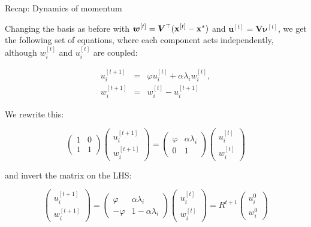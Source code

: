 \documentclass[11pt,compress,t,notes=noshow, xcolor=table]{beamer}
\begin{document}
\begin{vbframe}{Recap: Dynamics of momentum}

Changing the basis as before with $\boldsymbol{w}^{[ t ] } = \bm{V}^\top (\mathbf{x}^{[ t ] } - \mathbf{x}^\ast)$ and $\boldsymbol{u}^{[ t ] } = \bm{V} \boldsymbol{\nu}^{[ t ] }$, we get the following set of equations, where each component acts independently, although $w_i^{[ t ] }$ and $u_i^{[ t ] }$ are coupled: 

\begin{eqnarray*}
	u_i^{[ t+1 ] } &=& \varphi u_i^{[ t ] } + \alpha \lambda_i w_i^{[ t ] }, \\
	w_i^{[ t+1 ] } &=& w_i^{[ t ] } - u_i^{[ t+1 ] }
\end{eqnarray*}

We rewrite this: 

\begin{equation*}
\begin{pmatrix}
	1 & 0 \\
	1 & 1 
\end{pmatrix}  \begin{pmatrix}
u_i^{[ t+1 ] } \\
w_i^{[ t+1 ] }
\end{pmatrix} = 
\begin{pmatrix}
	\varphi & \alpha \lambda_i \\
	0 & 1 
\end{pmatrix}  \begin{pmatrix}
	u_i^{[ t ] } \\
	w_i^{[ t ] }
\end{pmatrix}
\end{equation*}

and invert the matrix on the LHS: 

\begin{equation*}
\begin{pmatrix}
		u_i^{[ t+1 ] } \\
		w_i^{[ t+1 ] }
	\end{pmatrix} = 
	\begin{pmatrix}
		\varphi & \alpha \lambda_i \\
		-\varphi & 1 - \alpha \lambda_i
	\end{pmatrix}  \begin{pmatrix}
		u_i^{[ t ] } \\
		w_i^{[ t ] }
	\end{pmatrix} = R^{ t+1 }  \begin{pmatrix}
	u_i^{0} \\
	w_i^{0}
\end{pmatrix}
\end{equation*}


\end{vbframe}
\end{document}

